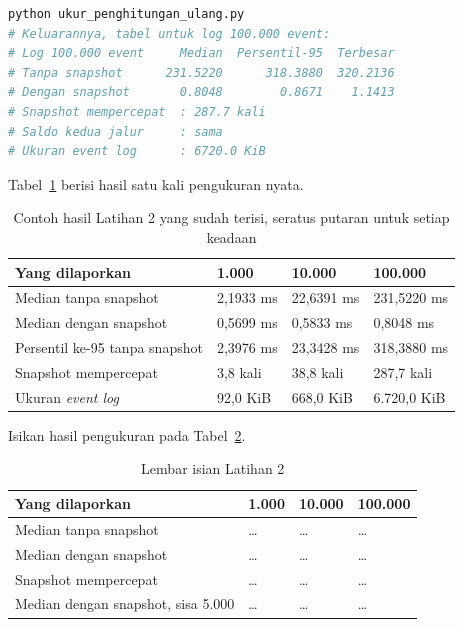 \begin{lstlisting}[language=bash, caption={Mengukur \textit{replay cost}, skrip
  tersedia di \berkas{sources/chapter10/ukur_penghitungan_ulang.py}},
  label=lst:jalankan-replay]
python ukur_penghitungan_ulang.py
# Keluarannya, tabel untuk log 100.000 event:
# Log 100.000 event     Median  Persentil-95  Terbesar
# Tanpa snapshot      231.5220      318.3880  320.2136
# Dengan snapshot       0.8048        0.8671    1.1413
# Snapshot mempercepat  : 287.7 kali
# Saldo kedua jalur     : sama
# Ukuran event log      : 6720.0 KiB
\end{lstlisting}

Tabel~\ref{tab:lat2cqrs-contoh} berisi hasil satu kali pengukuran nyata.

\begin{table}[htbp]
  \centering
  \caption{Contoh hasil Latihan 2 yang sudah terisi, seratus putaran untuk
    setiap keadaan}
  \label{tab:lat2cqrs-contoh}
  \begin{tabularx}{\textwidth}{|X|l|l|l|}
    \hline
    \textbf{Yang dilaporkan} & \textbf{1.000} & \textbf{10.000} & \textbf{100.000} \\
    \hline
    Median tanpa snapshot & 2,1933 ms & 22,6391 ms & 231,5220 ms \\
    \hline
    Median dengan snapshot & 0,5699 ms & 0,5833 ms & 0,8048 ms \\
    \hline
    Persentil ke-95 tanpa snapshot & 2,3976 ms & 23,3428 ms & 318,3880 ms \\
    \hline
    Snapshot mempercepat & 3,8 kali & 38,8 kali & 287,7 kali \\
    \hline
    Ukuran \textit{event log} & 92,0 KiB & 668,0 KiB & 6.720,0 KiB \\
    \hline
  \end{tabularx}
\end{table}

Isikan hasil pengukuran pada Tabel~\ref{tab:lat2cqrs-hasil}.

\begin{table}[htbp]
  \centering
  \caption{Lembar isian Latihan 2}
  \label{tab:lat2cqrs-hasil}
  \begin{tabularx}{\textwidth}{|X|l|l|l|}
    \hline
    \textbf{Yang dilaporkan} & \textbf{1.000} & \textbf{10.000} & \textbf{100.000} \\
    \hline
    Median tanpa snapshot & \dots & \dots & \dots \\
    \hline
    Median dengan snapshot & \dots & \dots & \dots \\
    \hline
    Snapshot mempercepat & \dots & \dots & \dots \\
    \hline
    Median dengan snapshot, sisa 5.000 & \dots & \dots & \dots \\
    \hline
  \end{tabularx}
\end{table}

